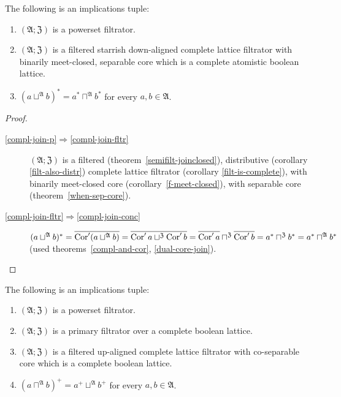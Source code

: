 \begin{thm}
\label{compl-join}The following is an implications tuple:
\begin{enumerate}
\item \label{compl-join-p}$(\mathfrak{A};\mathfrak{Z})$ is a powerset
filtrator.
\item \label{compl-join-fltr}$(\mathfrak{A};\mathfrak{Z})$ is a filtered
starrish down-aligned complete lattice filtrator with binarily meet-closed,
separable core which is a complete atomistic boolean lattice.
\item \label{compl-join-conc}$(a\sqcup^{\mathfrak{A}}b)^{\ast}=a^{\ast}\sqcap^{\mathfrak{A}}b^{\ast}$
for every $a,b\in\mathfrak{A}$.
\end{enumerate}
\end{thm}
\begin{proof}
~
\begin{description}
\item [{\ref{compl-join-p}$\Rightarrow$\ref{compl-join-fltr}}] $(\mathfrak{A};\mathfrak{Z})$
is a filtered (theorem~\ref{semifilt-joinclosed}), distributive
(corollary \ref{filt-also-distr}) complete lattice filtrator (corollary
\ref{filt-is-complete}), with binarily meet-closed core (corollary~\ref{f-meet-closed}),
with separable core (theorem~\ref{when-sep-core}).
\item [{\ref{compl-join-fltr}$\Rightarrow$\ref{compl-join-conc}}] $(a\sqcup^{\mathfrak{A}}b)^{\ast}=\overline{\operatorname{Cor}'(a\sqcup^{\mathfrak{A}}b)}=\overline{\operatorname{Cor}'a\sqcup^{\mathfrak{Z}}\operatorname{Cor}'b}=\overline{\operatorname{Cor}'a}\sqcap^{\mathfrak{Z}}\overline{\operatorname{Cor}'b}=a^{\ast}\sqcap^{\mathfrak{Z}}b^{\ast}=a^{\ast}\sqcap^{\mathfrak{A}}b^{\ast}$
(used theorems~\ref{compl-and-cor}, \ref{dual-core-join}).
\end{description}
\end{proof}

\begin{thm}
The following is an implications tuple:
\begin{enumerate}
\item \label{meet-dpseudo-p}$(\mathfrak{A};\mathfrak{Z})$ is a powerset filtrator.
\item \label{meet-dpseudo-f}$(\mathfrak{A};\mathfrak{Z})$ is a primary filtrator over a complete boolean lattice.
\item \label{meet-dpseudo-fltr}$(\mathfrak{A};\mathfrak{Z})$ is a filtered up-aligned complete lattice filtrator with
co-separable core which is a complete boolean lattice.
\item \label{meet-dpseudo-res}$(a\sqcap^{\mathfrak{A}}b)^{+}=a^{+}\sqcup^{\mathfrak{A}}b^{+}$
for every $a,b\in\mathfrak{A}$.
\end{enumerate}
\end{thm}

